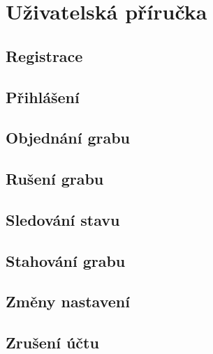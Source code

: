 \chapter{Uživatelská příručka}

\section{Registrace}
\section{Přihlášení}
\section{Objednání grabu}
\section{Rušení grabu}
\section{Sledování stavu}
\section{Stahování grabu}
\section{Změny nastavení}
\section{Zrušení účtu}
